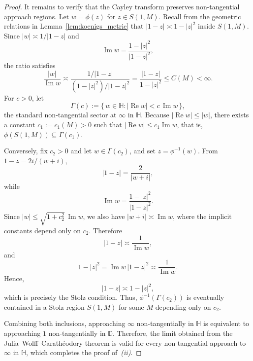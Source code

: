 \documentclass[12pt]{amsart}
\numberwithin{equation}{section}
\theoremstyle{plain}
\theoremstyle{definition}
\begin{document}
\begin{proof}
It remains to verify that the Cayley transform preserves
non-tangential approach regions.
Let $w=\phi(z)$ for $z\in S(1,M)$.
Recall from the geometric relations in
Lemma~\ref{lem:koenigs_metric} that
$|1-z|\asymp1-|z|^2$
inside $S(1,M)$.
Since
$|w|\asymp1/|1-z|$
and
\begin{equation*}
\operatorname{Im}w
=
\frac{1-|z|^2}{|1-z|^2},
\end{equation*}
the ratio satisfies
\begin{equation*}
\frac{|w|}{\operatorname{Im}w}
\asymp
\frac{1/|1-z|}
{(1-|z|^2)/|1-z|^2}
=
\frac{|1-z|}{1-|z|^2}
\le C(M)<\infty.
\end{equation*}
For $c>0$, let
\begin{equation*}
\Gamma(c)
:=
\{\,w\in\mathbb H:
|\operatorname{Re}w|
<
c\,\operatorname{Im}w
\,\},
\end{equation*}
the standard non-tangential sector at $\infty$ in $\mathbb H$.
Because $|\operatorname{Re}w|\le|w|$, there exists a constant
$c_1:=c_1(M)>0$ such that
$|\operatorname{Re}w|
\le
c_1\operatorname{Im}w$,
that is,
$\phi(S(1,M))
\subseteq
\Gamma(c_1)$.

Conversely, fix $c_2>0$ and let
$w\in\Gamma(c_2)$, and set
$z=\phi^{-1}(w)$.
From
$1-z=2i/(w+i)$,
\begin{equation*}
|1-z|
=
\frac2{|w+i|},
\end{equation*}
while
\begin{equation*}
\operatorname{Im}w
=
\frac{1-|z|^2}{|1-z|^2}.
\end{equation*}
Since
$|w|
\le
\sqrt{1+c_2^2}\,\operatorname{Im}w$,
we also have
$|w+i|
\asymp
\operatorname{Im}w$,
where the implicit constants depend only on $c_2$.
Therefore
\begin{equation*}
|1-z|
\asymp
\frac1{\operatorname{Im}w},
\end{equation*}
and
\begin{equation*}
1-|z|^2
=
\operatorname{Im}w\,|1-z|^2
\asymp
\frac1{\operatorname{Im}w}.
\end{equation*}
Hence,
\begin{equation*}
|1-z|
\asymp
1-|z|^2,
\end{equation*}
which is precisely the Stolz condition.
Thus,
$\phi^{-1}(\Gamma(c_2))$
is eventually contained in a Stolz region
$S(1,M)$ for some $M$ depending only on $c_2$.

Combining both inclusions, approaching $\infty$
non-tangentially in $\mathbb{H}$ is equivalent to
approaching $1$ non-tangentially in $\mathbb{D}$.
Therefore, the limit obtained from the
Julia--Wolff--Carath\'eodory theorem is valid for every
non-tangential approach to $\infty$ in $\mathbb{H}$,
which completes the proof of~\emph{(ii)}.
\end{proof}
\end{document}
